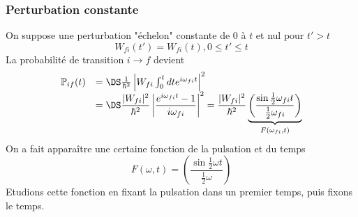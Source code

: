 		\subsubsection{Perturbation constante}
		On suppose une perturbation "échelon" constante de 0 à $t$ et nul pour $t'>t$
		\begin{equation}
		W_{fi}(t') = W_{fi}(t), 0\leq t'\leq t		
		\end{equation}
		La probabilité de transition $i\rightarrow f$ devient
		\begin{equation}
		\begin{array}{ll}
		\mathbb{P}_{if}(t) &=\DS \frac{1}{\hbar^2}\left|W_{fi}\int_0^t dt e^{i\omega_{fi}t}\right|^2		\\
		&=\DS \dfrac{|W_{fi}|^2}{\hbar^2}\left|\dfrac{e^{i\omega_{fi}t}-1}{i\omega_{fi}}\right|^2 = 
		\dfrac{|W_{fi}|^2}{\hbar^2}\underbrace{\left(\dfrac{\sin\frac{1}{2}\omega_{fi}t}{\frac{1}{2}\omega_{fi}}
		\right)}_{F(\omega_{fi},t)}
		\end{array}
		\end{equation}
		On a fait apparaître une certaine fonction de la pulsation et du temps
		\begin{equation}
		F(\omega,t) = \left(\frac{\sin\frac{1}{2}\omega t}{\frac{1}{2}\omega}\right)
		\end{equation}
		Etudions cette fonction en fixant la pulsation dans un premier temps, puis fixons le temps.
